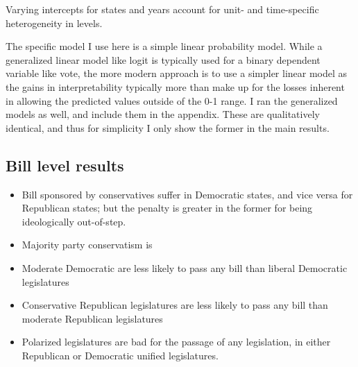 \documentclass[
  oneside]{book}
\providecommand{\tightlist}{%
  \setlength{\itemsep}{0pt}\setlength{\parskip}{0pt}}
\begin{document}
Varying intercepts for states and years account for unit- and time-specific heterogeneity in levels.

The specific model I use here is a simple linear probability model. While a generalized linear model like logit is typically used for a binary dependent variable like vote, the more modern approach is to use a simpler linear model as the gains in interpretability typically more than make up for the losses inherent in allowing the predicted values outside of the 0-1 range. I ran the generalized models as well, and include them in the appendix. These are qualitatively identical, and thus for simplicity I only show the former in the main results.

\hypertarget{bill-level-results}{%
\subsection{Bill level results}\label{bill-level-results}}

\begin{itemize}
\tightlist
\item
  Bill sponsored by conservatives suffer in Democratic states, and vice versa for Republican states; but the penalty is greater in the former for being ideologically out-of-step.
\end{itemize}

\begin{itemize}
\item
  Majority party conservatism is
\item
  Moderate Democratic are less likely to pass any bill than liberal Democratic legislatures
\item
  Conservative Republican legislatures are less likely to pass any bill than moderate Republican legislatures
\item
  Polarized legislatures are bad for the passage of any legislation, in either Republican or Democratic unified legislatures.
\end{itemize}
\end{document}
